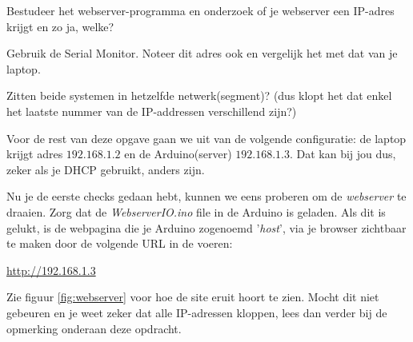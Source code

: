 \newpage
\begin{exercise}
Bestudeer het webserver-programma en onderzoek of je webserver een IP-adres krijgt en zo ja, welke? 

Gebruik de Serial Monitor. Noteer dit adres ook en vergelijk het met dat van je laptop.

Zitten beide systemen in hetzelfde netwerk(segment)? (dus klopt het dat enkel het laatste nummer van de IP-addressen verschillend zijn?)




\end{exercise}

\begin{remark}
Voor de rest van deze opgave gaan we uit van de volgende configuratie: de laptop krijgt adres $192.168.1.2$ en de Arduino(server) $192.168.1.3$. Dat kan bij jou dus, zeker als je DHCP gebruikt, anders zijn.
\end{remark}

Nu je de eerste checks gedaan hebt, kunnen we eens proberen om de \textit{webserver} te draaien. Zorg dat de \textit{WebserverIO.ino} file in de Arduino is geladen. Als dit is gelukt, is de webpagina die je Arduino zogenoemd '\textit{host}', via je browser zichtbaar te maken door de volgende URL in de voeren:

\url{http://192.168.1.3}

Zie figuur \ref{fig:webserver} voor hoe de site eruit hoort te zien. Mocht dit niet gebeuren en je weet zeker dat alle IP-adressen kloppen, lees dan verder bij de opmerking onderaan deze opdracht.

